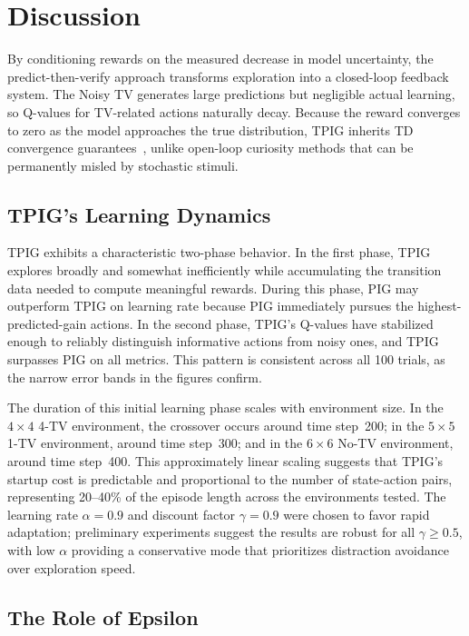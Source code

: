 \documentclass[letterpaper]{article} %
\begin{document}
\section{Discussion}

By conditioning rewards on the measured decrease in model uncertainty,
the predict-then-verify approach transforms exploration into a
closed-loop feedback system.  The Noisy TV generates large predictions
but negligible actual learning, so Q-values for TV-related actions
naturally decay.  Because the reward converges to zero as the model
approaches the true distribution, TPIG inherits TD convergence
guarantees~\cite{Sutton1998}, unlike open-loop curiosity methods that
can be permanently misled by stochastic stimuli.

\subsection{TPIG's Learning Dynamics}

TPIG exhibits a characteristic two-phase behavior.  In the first
phase, TPIG explores broadly and somewhat inefficiently while
accumulating the transition data needed to compute meaningful rewards.
During this phase, PIG may outperform TPIG on learning rate because
PIG immediately pursues the highest-predicted-gain actions.  In the
second phase, TPIG's Q-values have stabilized enough to reliably
distinguish informative actions from noisy ones, and TPIG surpasses
PIG on all metrics.  This pattern is consistent across all 100 trials,
as the narrow error bands in the figures confirm.

The duration of this initial learning phase scales with environment
size.  In the $4 \times 4$ 4-TV environment, the crossover occurs
around time step~200; in the $5 \times 5$ 1-TV environment, around
time step~300; and in the $6 \times 6$ No-TV environment, around time
step~400.  This approximately linear scaling suggests that TPIG's startup cost
is predictable and proportional to the number of state-action pairs,
representing 20--40\% of the episode length across the environments
tested.
The learning rate $\alpha = 0.9$ and
discount factor $\gamma = 0.9$ were chosen to favor rapid adaptation;
preliminary experiments suggest the results are robust for all
$\gamma \geq 0.5$, with low $\alpha$ providing a conservative mode
that prioritizes distraction avoidance over exploration speed.

\subsection{The Role of Epsilon}
\end{document}
